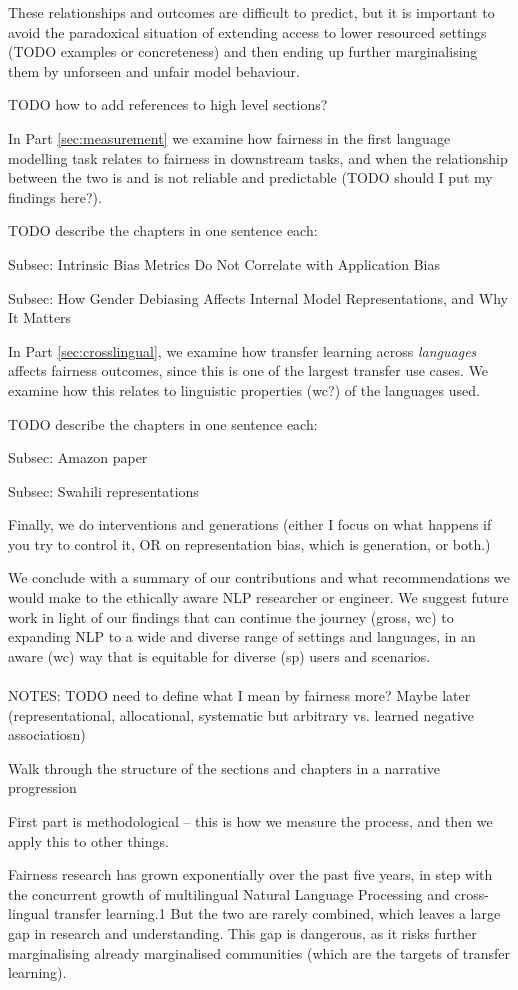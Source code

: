 These relationships and outcomes are difficult to predict, but it is important to avoid the paradoxical situation of extending access to lower resourced settings (TODO examples or concreteness) and then ending up further marginalising them by unforseen and unfair model behaviour. 


TODO how to add references to high level sections?

In Part \ref{sec:measurement} we examine how fairness in the first language modelling task relates to fairness in downstream tasks, and when the relationship between the two is and is not reliable and predictable (TODO should I put my findings here?).

TODO describe the chapters in one sentence each:

Subsec: Intrinsic Bias Metrics Do Not Correlate with Application Bias

Subsec: How Gender Debiasing Affects Internal Model Representations, and Why It Matters

In Part \ref{sec:crosslingual}, we examine how transfer learning across \textit{languages} affects fairness outcomes, since this is one of the largest transfer use cases. We examine how this relates to linguistic properties (wc?) of the languages used.

TODO describe the chapters in one sentence each:

Subsec: Amazon paper

Subsec: Swahili representations

Finally, we do interventions and generations (either I focus on what happens if you try to control it, OR on representation bias, which is generation, or both.)

We conclude with a summary of our contributions and what recommendations we would make to the ethically aware NLP researcher or engineer. We suggest future work in light of our findings that can continue the journey (gross, wc) to expanding NLP to a wide and diverse range of settings and languages, in an aware (wc) way that is equitable for diverse (sp) users and scenarios. \\\\

NOTES:
TODO need to define what I mean by fairness more? Maybe later (representational, allocational, systematic but arbitrary vs. learned negative associatiosn)

Walk through the structure of the sections and chapters in a narrative progression


First part is methodological -- this is how we measure the process, and then we apply this to other things.



Fairness research has grown exponentially over the
past five years, in step with the concurrent growth
of multilingual Natural Language Processing
and cross-lingual transfer learning.1 But the
two are rarely combined, which leaves a large
gap in research and understanding. This gap is
dangerous, as it risks further marginalising already
marginalised communities (which are the targets of
transfer learning). 